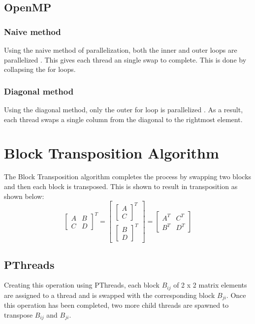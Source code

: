 \documentclass[a4paper,10pt]{article}
\begin{document}
\subsection{OpenMP}

\subsubsection{Naive method}

Using the naive method of parallelization, both the inner and outer loops are parallelized .
This gives each thread an single swap to complete.
This is done by collapsing the for loops.

\subsubsection{Diagonal method}

Using the diagonal method, only the outer for loop is parallelized .
As a result, each thread swaps a single column from the diagonal to the rightmost element.

\section{Block Transposition Algorithm}
The Block Transposition algorithm completes the process by swapping two blocks and then each block is transposed. This is shown to result in transposition as shown below:
$$ \begin{bmatrix}
A & B \\ 
C & D
\end{bmatrix} ^T
= 
\begin{bmatrix}
\begin{bmatrix}
A\\ 
C
\end{bmatrix} ^T \\ 
\begin{bmatrix}
B
\\ 
D
\end{bmatrix} ^T
\end{bmatrix}
= 
\begin{bmatrix}
A^T & C^T \\ 
B^T & D^T
\end{bmatrix}
$$

\subsection{PThreads}

Creating this operation using PThreads, each block $B_{ij}$ of 2 x 2 matrix elements are assigned to a thread and is swapped with the corresponding block $B_{ji}$. Once this operation has been completed, two more child threads are spawned to transpose $B_{ij}$ and $B_{ji}$.
\end{document}

